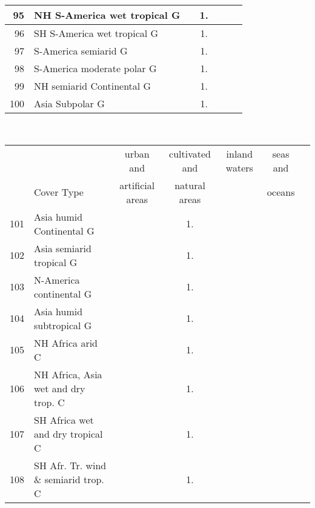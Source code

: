 {{\begin{tabular}{||r|l||c|c|c|c|c||}
 \hline
          95  & NH S-America wet tropical G                                  &       &  1.   &       &       \\
 \hline
          96  & SH S-America wet tropical G                                  &       &  1.   &       &       \\
 \hline
          97  & S-America semiarid G                                         &       &  1.   &       &       \\
 \hline
          98  & S-America moderate polar G                                   &       &  1.   &       &       \\
 \hline
          99  & NH semiarid Continental G                                    &       &  1.   &       &       \\
 \hline
         100  & Asia Subpolar G                                              &       &  1.   &       &       \\
 \hline
 \end{tabular}
 \clearpage
 \medskip\
 \begin{tabular}{||r|l||c|c|c|c|c||}
 \hline
 \hline
 && urban and & cultivated and &inland waters&seas and\\
 &Cover Type& artificial areas & natural areas&&oceans\\
 \hline
 \hline
         101  & Asia humid Continental G                                     &       &  1.   &       &       \\
 \hline
         102  & Asia semiarid tropical G                                     &       &  1.   &       &       \\
 \hline
         103  & N-America continental G                                      &       &  1.   &       &       \\
 \hline
         104  & Asia humid subtropical G                                     &       &  1.   &       &       \\
 \hline
 \hline
         105  & NH Africa arid C                                             &       &  1.   &       &       \\
 \hline
         106  & NH Africa, Asia wet and dry trop. C                          &       &  1.   &       &       \\
 \hline
         107  & SH Africa wet and dry tropical C                             &       &  1.   &       &       \\
 \hline
         108  & SH Afr. Tr. wind \& semiarid trop. C                         &       &  1.   &       &       \\

\end{tabular}}}
